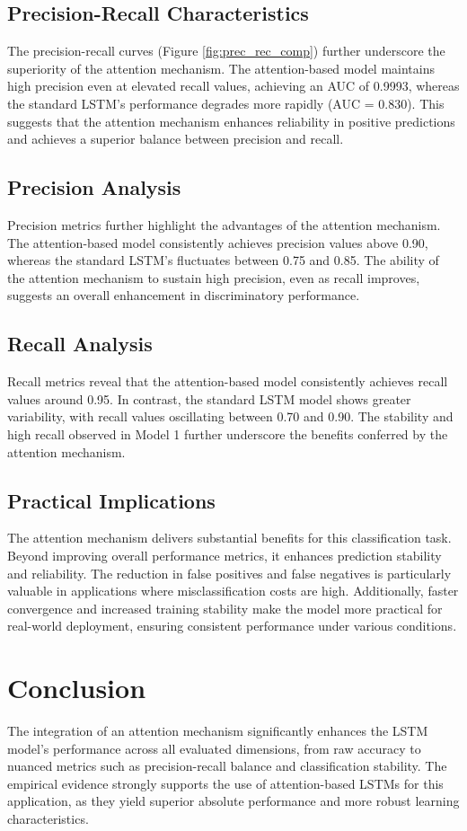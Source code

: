 \documentclass[sn-mathphys-ay, Numbered]{sn-jnl}
\theoremstyle{thmstyleone}%
\theoremstyle{thmstyletwo}%
\theoremstyle{thmstylethree}%
\begin{document}
\subsection{Precision-Recall Characteristics}
The precision-recall curves (Figure \ref{fig:prec_rec_comp}) further underscore the superiority of the attention mechanism. The attention-based model maintains high precision even at elevated recall values, achieving an AUC of 0.9993, whereas the standard LSTM’s performance degrades more rapidly (AUC = 0.830). This suggests that the attention mechanism enhances reliability in positive predictions and achieves a superior balance between precision and recall.
\subsection{Precision Analysis}
Precision metrics further highlight the advantages of the attention mechanism. The attention-based model consistently achieves precision values above 0.90, whereas the standard LSTM’s fluctuates between 0.75 and 0.85. The ability of the attention mechanism to sustain high precision, even as recall improves, suggests an overall enhancement in discriminatory performance.
\subsection{Recall Analysis}
Recall metrics reveal that the attention-based model consistently achieves recall values around 0.95. In contrast, the standard LSTM model shows greater variability, with recall values oscillating between 0.70 and 0.90. The stability and high recall observed in Model 1 further underscore the benefits conferred by the attention mechanism.


\subsection{Practical Implications}
The attention mechanism delivers substantial benefits for this classification task. Beyond improving overall performance metrics, it enhances prediction stability and reliability. The reduction in false positives and false negatives is particularly valuable in applications where misclassification costs are high. Additionally, faster convergence and increased training stability make the model more practical for real-world deployment, ensuring consistent performance under various conditions.

\section{Conclusion}
The integration of an attention mechanism significantly enhances the LSTM model’s performance across all evaluated dimensions, from raw accuracy to nuanced metrics such as precision-recall balance and classification stability. The empirical evidence strongly supports the use of attention-based LSTMs for this application, as they yield superior absolute performance and more robust learning characteristics.
\end{document}
